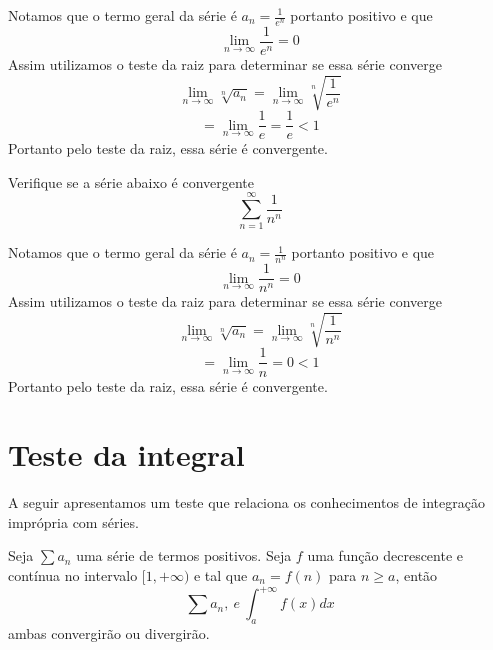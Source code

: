 \begin{exer}
    Notamos que o termo geral da série é $a_n = \frac{1}{e^n}$ portanto positivo
    e que
    $$\lim_{n \to \infty} \frac{1}{e^n} = 0$$
    Assim utilizamos o teste da raiz para determinar se essa série converge
    $$\lim_{n \to \infty} \sqrt[n]{a_n} = \lim_{n \to \infty} \sqrt[n]{\frac{1}{e^n}} $$
    $$ = \lim_{n \to \infty} \frac{1}{e} = \frac{1}{e} < 1 $$
    Portanto pelo teste da raiz, essa série é convergente.
\end{exer}

\begin{exer}
    Verifique se a série abaixo é convergente 
    $$\sum_{n =1}^{\infty} \frac{1}{n^n}$$
\end{exer}

\begin{exer}
    Notamos que o termo geral da série é $a_n = \frac{1}{n^n}$ portanto positivo
    e que
    $$\lim_{n \to \infty} \frac{1}{n^n} = 0$$
    Assim utilizamos o teste da raiz para determinar se essa série converge
    $$\lim_{n \to \infty} \sqrt[n]{a_n} = \lim_{n \to \infty} \sqrt[n]{\frac{1}{n^n}} $$
    $$ = \lim_{n \to \infty} \frac{1}{n} = 0 < 1 $$
    Portanto pelo teste da raiz, essa série é convergente.
\end{exer}

\section{Teste da integral}
\construirSec

A seguir apresentamos um teste que relaciona os conhecimentos de integração
imprópria com séries.

\begin{teo}
    Seja $\sum a_n$ uma série de termos positivos. Seja $f$ uma função
    decrescente e contínua no intervalo $[1, +\infty)$ e tal que 
    $a_n = f(n)$ para $n \geq a$, então
    $$\sum a_n, \: e \: \int_a^{+\infty} f(x) dx $$
    ambas convergirão ou divergirão. 
\end{teo}

